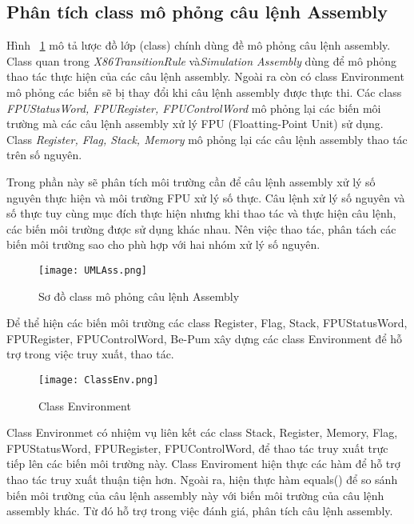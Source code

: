 	\subsection{Phân tích class mô phỏng câu lệnh Assembly}
	Hình ~\ref{fig:SoDoClassAss}	mô tả lược đồ lớp (class)  chính dùng đề mô phỏng câu lệnh assembly. Class quan trong \textit{X86TransitionRule} và\textit{Simulation Assembly} dùng để mô phỏng thao tác thực hiện của các câu lệnh assembly. Ngoài ra còn có class Environment mô phỏng các biến sẽ bị thay đổi khi câu lệnh assembly được thực thi. Các class \textit{FPUStatusWord, FPURegister, FPUControlWord} mô phỏng lại các biến môi trường mà các câu lệnh assembly xử lý FPU (Floatting-Point Unit) sử dụng. Class \textit{Register, Flag, Stack, Memory} mô phỏng lại các câu lệnh assembly thao tác trên số nguyên.
	
	Trong phần này sẽ phân tích môi trường cần để câu lệnh assembly xử lý số nguyên thực hiện và môi trường FPU xử lý số thực. Câu lệnh xử lý số nguyên và số thực tuy cùng mục đích thực hiện nhưng khi thao tác và thực hiện câu lệnh, các biến môi trường được sử dụng khác nhau. Nên việc thao tác, phân tách các biến môi trường sao cho phù hợp với hai nhóm xử lý số nguyên.
	
		\begin{center}
			\begin{figure}[htp]
				\begin{center}
					\texttt{[image: UMLAss.png]}
				\end{center}
				\caption{Sơ đồ class mô phỏng câu lệnh Assembly}	
					\label{fig:SoDoClassAss}		
			\end{figure}
		\end{center}			
		
		Để thể hiện các biến môi trường các class Register, Flag, Stack, FPUStatusWord, FPURegister, FPUControlWord,  Be-Pum xây dựng các class Environment để hỗ trợ trong việc truy xuất, thao tác.
	
		\begin{center}
			\begin{figure}[htp]
				\begin{center}
					\texttt{[image: ClassEnv.png]}
				\end{center}
				\caption{Class Environment}	
					\label{fig:ClassEnv}		
			\end{figure}
		\end{center}					
		
		Class Environmet có nhiệm vụ liên kết các class Stack, Register, Memory, Flag, FPUStatusWord, FPURegister, FPUControlWord, để thao tác truy xuất trực tiếp lên các biến môi trường này. Class Enviroment hiện thực các hàm để hỗ trợ thao tác truy xuất thuận tiện hơn. Ngoài ra, hiện thực hàm equals() để so sánh biến môi trường của câu lệnh assembly này với biến môi trường của câu lệnh assembly khác. Từ đó hỗ trợ trong việc đánh giá, phân tích câu lệnh assembly.
		
